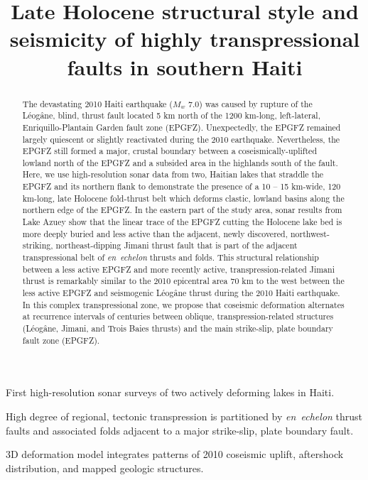 \documentclass[linenumbers,draft]{agujournal}
\begin{document}
\title{Late Holocene structural style and seismicity of highly transpressional faults in southern Haiti}



\begin{keypoints}
\item First high-resolution sonar surveys of two actively deforming lakes in Haiti.
\item High degree of regional, tectonic transpression is partitioned by \textit{en~echelon} thrust faults and associated folds adjacent to a major strike-slip, plate boundary fault.
\item 3D deformation model integrates patterns of 2010 coseismic uplift, aftershock distribution, and mapped geologic structures.
\end{keypoints}

\begin{abstract}
The devastating 2010 Haiti earthquake ($M_w$ 7.0) was caused by rupture of the L\'eog\^ane, blind, thrust fault located 5 km north of the 1200 km-long, left-lateral, Enriquillo-Plantain Garden fault zone (EPGFZ). Unexpectedly, the EPGFZ remained largely quiescent or slightly reactivated during the 2010 earthquake. Nevertheless, the EPGFZ still formed a major, crustal boundary between a coseismically-uplifted lowland north of the EPGFZ and a subsided area in the highlands south of the fault. Here, we use high-resolution sonar data from two, Haitian lakes that straddle the EPGFZ and its northern flank to demonstrate the presence of a 10 -- 15 km-wide, 120 km-long, late Holocene fold-thrust belt which deforms clastic, lowland basins along the northern edge of the EPGFZ. In the eastern part of the study area, sonar results from Lake Azuey show that the linear trace of the EPGFZ cutting the Holocene lake bed is more deeply buried and less active than the adjacent, newly discovered, northwest-striking, northeast-dipping Jimani thrust fault that is part of the adjacent transpressional belt of \textit{en~echelon} thrusts and folds. This structural relationship between a less active EPGFZ and more recently active, transpression-related Jimani thrust is remarkably similar to the 2010 epicentral area 70 km to the west between the less active EPGFZ and seismogenic L\'eog\^ane thrust during the 2010 Haiti earthquake. In this complex transpressional zone, we propose that coseismic deformation alternates at recurrence intervals of centuries between oblique, transpression-related structures (L\'eog\^ane, Jimani, and Trois Baies thrusts) and the main strike-slip, plate boundary fault zone (EPGFZ).
\end{abstract}
\end{document}
